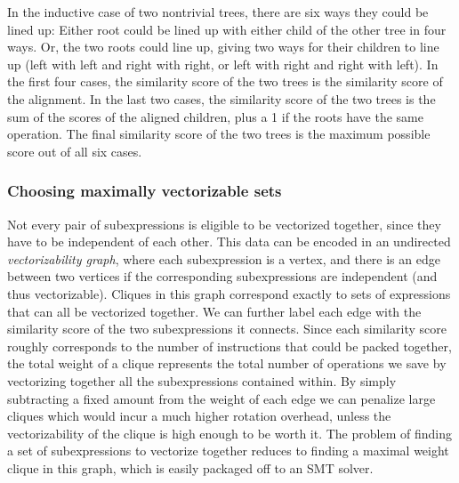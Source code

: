 In the inductive case of two nontrivial trees, there are six ways they could be lined up: 
Either root could be lined up with either child of the other tree in four ways. 
Or, the two roots could line up, giving two ways for their children to line up (left with left and right with right, or left with right and right with left).
In the first four cases, the similarity score of the two trees is the similarity score of the alignment. 
In the last two cases, the similarity score of the two trees is the sum of the scores of the aligned children, plus a 1 if the roots have the same operation.
The final similarity score of the two trees is the maximum possible score out of all six cases. 
\subsubsection*{Choosing maximally vectorizable sets}
Not every pair of subexpressions is eligible to be vectorized together, since they have to be independent of each other.
This data can be encoded in an undirected {\em vectorizability graph}, where each subexpression is a vertex, and there is an edge between two vertices if the corresponding subexpressions are independent (and thus vectorizable).
Cliques in this graph correspond exactly to sets of expressions that can all be vectorized together. 
We can further label each edge with the similarity score of the two subexpressions it connects.
Since each similarity score roughly corresponds to the number of instructions that could be packed together, the total weight of a clique represents the total number of operations we save by vectorizing together all the subexpressions contained within. 
By simply subtracting a fixed amount from the weight of each edge we can penalize large cliques which would incur a much higher rotation overhead, unless the vectorizability of the clique is high enough to be worth it.
The problem of finding a set of subexpressions to vectorize together reduces to finding a maximal weight clique in this graph, which is easily packaged off to an SMT solver.

